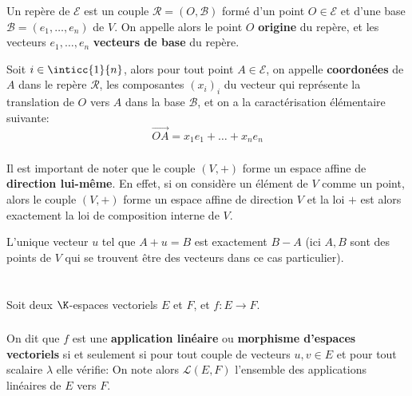 \subsection*{}
Un repère de \(\mathscr{E}\) est un couple \(\mathscr{R} = (O, \mathscr{B})\) formé d'un point \(O \in \mathscr{E}\) et d'une base \(\mathscr{B} = (e_1, \ldots, e_n)\) de \(V\). On appelle alors le point \(O\) \textbf{origine} du repère, et les vecteurs \(e_1, \ldots, e_n\) \textbf{vecteurs de base} du repère.\<

Soit \(i\in\inticc{1}{n}\), alors pour tout point \(A \in \mathscr{E}\), on appelle \textbf{coordonées} de \(A\) dans le repère \(\mathscr{R}\), les composantes \((x_i)_i\) du vecteur qui représente la translation de \(O\) vers \(A\) dans la base \(\mathscr{B}\), et on a la caractérisation élémentaire suivante:
\[
   \overrightarrow{OA} = x_1e_1 + \ldots + x_ne_n 
\]
\subsection*{}
Il est important de noter que le couple \((V, +)\) forme un espace affine de \textbf{direction lui-même}. En effet, si on considère un élément de \(V\) comme un point, alors le couple  \((V, +)\) forme un espace affine de direction \(V\) et la loi \(+\) est alors exactement la loi de composition interne de \(V\).\<

L'unique vecteur \(u\) tel que \(A + u = B\) est exactement \(B - A\) (ici \(A, B\) sont des points de \(V\) qui se trouvent être des vecteurs dans ce cas particulier).

\chapter*{} %

Soit deux \(\K\)-espaces vectoriels \(E\) et \(F\), et \(f : E \longrightarrow F \).

\subsection*{}

On dit que \(f\) est une \textbf{application linéaire} ou \textbf{morphisme d'espaces vectoriels} si et seulement si pour tout couple de vecteurs \(u, v \in E\) et pour tout scalaire \(\lambda\) elle vérifie: 
On note alors \(\mathcal{L}(E, F)\) l'ensemble des applications linéaires de \(E\) vers \(F\).\<

